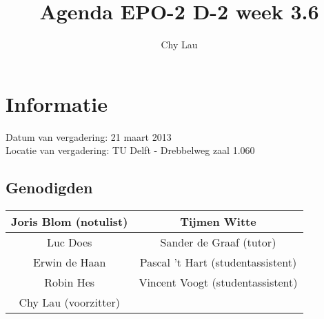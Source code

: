 \documentclass{article}
\begin{document}
\title{Agenda EPO-2 D-2 week 3.6}%
\author{Chy Lau}%
\maketitle

\section*{Informatie}
Datum van vergadering: 21 maart 2013\\ %
Locatie van vergadering: TU Delft - Drebbelweg zaal 1.060 %
\subsection*{Genodigden}
\begin{center}
\begin{tabular}{|c |c |}
	\hline
	Joris Blom (notulist) & Tijmen Witte \\
	\hline
	Luc Does & Sander de Graaf (tutor) \\
	\hline
	Erwin de Haan & Pascal 't Hart (studentassistent) \\
	\hline
	Robin Hes & Vincent Voogt (studentassistent) \\
	\hline
	Chy Lau (voorzitter) & \\
	\hline
\end{tabular}
\end{center}
\end{document}
